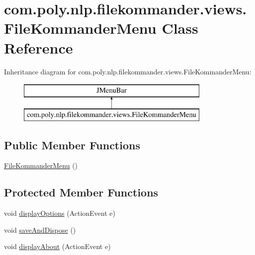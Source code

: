 \hypertarget{classcom_1_1poly_1_1nlp_1_1filekommander_1_1views_1_1_file_kommander_menu}{\section{com.\-poly.\-nlp.\-filekommander.\-views.\-File\-Kommander\-Menu Class Reference}
\label{classcom_1_1poly_1_1nlp_1_1filekommander_1_1views_1_1_file_kommander_menu}
}
Inheritance diagram for com.\-poly.\-nlp.\-filekommander.\-views.\-File\-Kommander\-Menu\-:\begin{figure}[H]
\begin{center}
\leavevmode
\includegraphics[height=2.000000cm]{classcom_1_1poly_1_1nlp_1_1filekommander_1_1views_1_1_file_kommander_menu}
\end{center}
\end{figure}
\subsection*{Public Member Functions}
\begin{DoxyCompactItemize}
\item 
\hyperlink{classcom_1_1poly_1_1nlp_1_1filekommander_1_1views_1_1_file_kommander_menu_a5d68fabb7e7f5cf7c94a3e29ef5631ee}{File\-Kommander\-Menu} ()
\end{DoxyCompactItemize}
\subsection*{Protected Member Functions}
\begin{DoxyCompactItemize}
\item 
void \hyperlink{classcom_1_1poly_1_1nlp_1_1filekommander_1_1views_1_1_file_kommander_menu_a27842ee6e2731a5b9d459852dcdd5a4d}{display\-Options} (Action\-Event e)
\item 
void \hyperlink{classcom_1_1poly_1_1nlp_1_1filekommander_1_1views_1_1_file_kommander_menu_ac5a9651b87cfddaa37774622acbfa3b8}{save\-And\-Dispose} ()
\item 
void \hyperlink{classcom_1_1poly_1_1nlp_1_1filekommander_1_1views_1_1_file_kommander_menu_a478a27e7168e5045b9f4ee5ffe1523cc}{display\-About} (Action\-Event e)
\end{DoxyCompactItemize}
